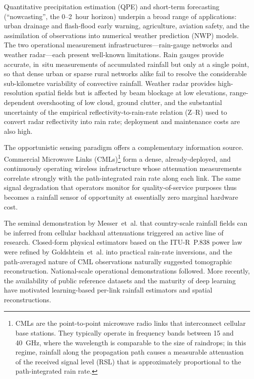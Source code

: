 \documentclass[12pt, a4paper]{article}
\begin{document}
Quantitative precipitation estimation (QPE) and short-term forecasting
(``nowcasting'', the 0--2~hour horizon) underpin a broad range of
applications: urban drainage and flash-flood early warning, agriculture,
aviation safety, and the assimilation of observations into numerical
weather prediction (NWP) models. The two operational measurement
infrastructures---rain-gauge networks and weather radar---each present
well-known limitations. Rain gauges provide accurate, in~situ
measurements of accumulated rainfall but only at a single point, so that
dense urban or sparse rural networks alike fail to resolve the
considerable sub-kilometre variability of convective rainfall. Weather
radar provides high-resolution spatial fields but is affected by beam
blockage at low elevations, range-dependent overshooting of low cloud,
ground clutter, and the substantial uncertainty of the empirical
reflectivity-to-rain-rate relation (Z--R) used to convert radar
reflectivity into rain rate; deployment and maintenance costs are also
high.

The opportunistic sensing paradigm offers a complementary information
source. Commercial Microwave Links (CMLs)\footnote{CMLs are the
point-to-point microwave radio links that interconnect cellular base
stations. They typically operate in frequency bands between 15 and
40~GHz, where the wavelength is comparable to the size of raindrops; in
this regime, rainfall along the propagation path causes a measurable
attenuation of the received signal level (RSL) that is approximately
proportional to the path-integrated rain rate.} form a dense,
already-deployed, and continuously operating wireless infrastructure
whose attenuation measurements correlate strongly with the
path-integrated rain rate along each link. The same signal degradation
that operators monitor for quality-of-service purposes thus becomes a
rainfall sensor of opportunity at essentially zero marginal hardware cost.

The seminal demonstration by \mbox{Messer et al.} \cite{messer2006} that
country-scale rainfall fields can be inferred from cellular backhaul
attenuations triggered an active line of research. Closed-form physical
estimators based on the ITU-R~P.838 power law \cite{ituR838} were refined
by \mbox{Goldshtein et al.} \cite{goldshtein2009} into practical rain-rate
inversions, and the path-averaged nature of CML observations naturally
suggested tomographic reconstruction. National-scale operational
demonstrations \cite{overeem2013} followed. More recently, the
availability of public reference datasets and the maturity of deep
learning have motivated learning-based per-link rainfall estimators and
spatial reconstructions.
\end{document}
